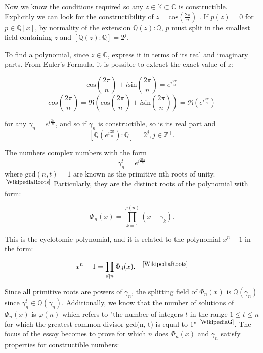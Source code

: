 \documentclass{article}
\begin{document}
\par

Now we know the conditions required so any $z\in\mathbb{K}\subset\mathbb{C}$ is constructible. Explicitly we can look for the constructibility of $z = \text{cos}(\frac{2\pi}{n})$ . If $p(z) = 0$ for $p\in\mathbb{Q}[x]$,  by normality of the extension $\mathbb{Q}(z) : \mathbb{Q}$, $p$ must split in the smallest field containing $z$ and  $[\mathbb{Q}(z) : \mathbb{Q}] = 2^j$.

\par
To find a polynomial, since $z\in\mathbb{C}$, express it in terms of its real and imaginary parts. From Euler's Formula, it is possible to extract the exact value of $z$:

$$\text{cos}(\frac{2\pi}{n}) + i\text{sin}(\frac{2\pi}{n}) = e^{i{\frac{2\pi}{n}}}$$
$$cos(\frac{2\pi}{n}) = \Re(\text{cos}(\frac{2\pi}{n}) + i\text{sin}(\frac{2\pi}{n})) = \Re(e^{i{\frac{2\pi}{n}}})$$ 

for any $\gamma_n = e^{i{\frac{2\pi}{n}}}$, and so if $\gamma_n$ is constructible,  so is its real part and $$[\mathbb{Q}(e^{i{\frac{2\pi}{n}}}) : \mathbb{Q}] = 2^j,j\in\mathbb{Z}^{+}.$$

The numbers complex numbers with the form $$\gamma_{n}^{t} = e^{i{\frac{2t\pi}{n}}}$$ where $\text{gcd}(n, t) = 1$ are known as the primitive nth roots of unity. $^{\textrm{\footnotesize\cite{WikipediaRoots}}}$ Particularly, they are the distinct roots of the polynomial with form:

$$\Phi_n(x)  = \prod_{k = 1}^{\varphi(n)} (x- \gamma_k).$$

This is the cyclotomic polynomial, and it is related to the polynomial $x^n-1$ in the form:

$$x^n-1 = \prod_{d \vert n} \Phi_d(x). \quad ^{\textrm{\footnotesize\cite{WikipediaRoots}}}$$







Since all primitive roots  are powers of $\gamma_n$, the splitting field of $\Phi_n(x)$ is $\mathbb{Q}(\gamma_n)$ since $\gamma_{n}^{t}\in\mathbb{Q}(\gamma_n)$. Additionally, we know that the number of solutions of $\Phi_n(x)$ is $\varphi(n)$ which refers to "the number of integers $t$ in the range $1 \leq t \leq n$ for which the greatest common divisor gcd(n, t) is equal to 1" $^{\textrm{\footnotesize\cite{WikipediaG}}}$. The focus of the essay becomes to prove for which $n$ does $\Phi_n(x)$ and $\gamma_n$ satisfy properties for constructible numbers:
\end{document}
